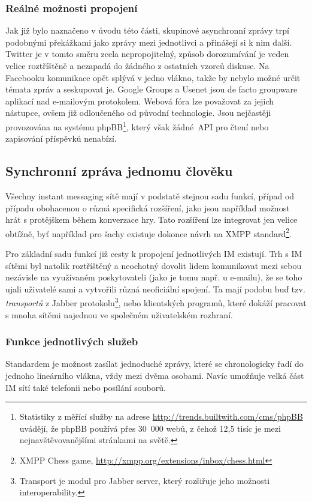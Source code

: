 \documentclass[12pt,oneside,final]{fithesis2}
\begin{document}
\subsubsection*{Reálné možnosti propojení}
Jak již bylo naznačeno v úvodu této části, skupinové asynchronní zprávy trpí podobnými překážkami jako zprávy mezi jednotlivci a přinášejí si k nim další. Twitter je v tomto směru zcela nepropojitelný, způsob dorozumívání je veden velice roztříštěně a nezapadá do žádného z ostatních vzorců diskuse. Na Facebooku komunikace opět splývá v jedno vlákno, takže by nebylo možné určit témata zpráv a seskupovat je. Google Groups a Usenet jsou de facto groupware aplikací nad e-mailovým protokolem. Webová fóra lze považovat za jejich nástupce, ovšem již odloučeného od původní technologie. Jsou nejčastěji provozována na systému phpBB\footnote{Statistiky z měřící služby na adrese \url{http://trends.builtwith.com/cms/phpBB} uvádějí, že phpBB používá přes 30~000 webů, z čehož 12,5 tisíc je mezi nejnavštěvovanějšími stránkami na světě.}, který však žádné~API pro čtení nebo zapisování příspěvků nenabízí.

\subsection{Synchronní zpráva jednomu člověku}
Všechny instant messaging sítě mají v podstatě stejnou sadu funkcí, případ od případu obohacenou o různá specifická rozšíření, jako jsou například možnost hrát s protějškem během konverzace hry. Tato rozšíření lze integrovat jen velice obtížně, byť například pro šachy existuje dokonce návrh na XMPP standard\footnote{XMPP Chess game, \url{http://xmpp.org/extensions/inbox/chess.html}}.

Pro základní sadu funkcí již cesty k propojení jednotlivých IM existují. Trh s IM sítěmi byl natolik roztříštěný a neochotný dovolit lidem komunikovat mezi sebou nezávisle na využívaném poskytovateli (jako je tomu např. u e-mailu), že se toho ujali uživatelé sami a vytvořili různá neoficiální spojení. Ta mají podobu buď tzv. \emph{transportů} z Jabber protokolu\footnote{Transport je modul pro Jabber server, který rozšiřuje jeho možnosti interoperability.}, nebo klientských programů, které dokáží pracovat s mnoha sítěmi najednou ve společném uživatelském rozhraní.

\subsubsection*{Funkce jednotlivých služeb}
Standardem je možnost zasílat jednoduché zprávy, které se chronologicky řadí do jednoho lineárního vlákna, vždy mezi dvěma osobami. Navíc umožňuje velká část IM sítí také telefonii nebo posílání souborů.
\end{document}
